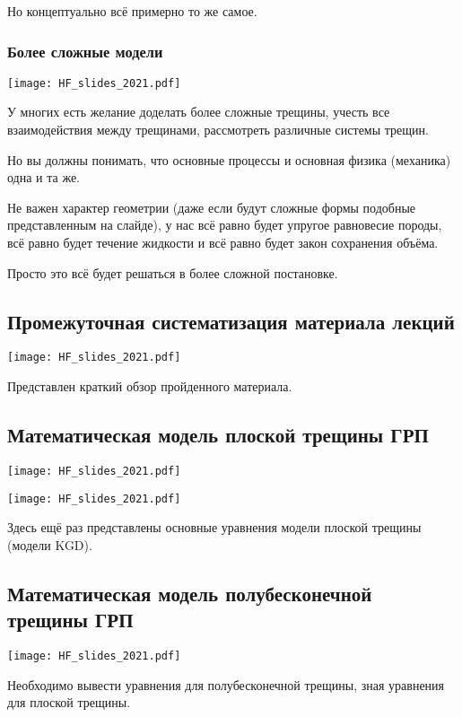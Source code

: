 \documentclass[main.tex]{subfiles}
\begin{document}
Но концептуально всё примерно то же самое.

\subsubsection{Более сложные модели}

\texttt{[image: HF\_slides\_2021.pdf]}

У многих есть желание доделать более сложные трещины, учесть все взаимодействия между трещинами, рассмотреть различные системы трещин.

Но вы должны понимать, что основные процессы и основная физика (механика) одна и та же.

Не важен характер геометрии (даже если будут сложные формы подобные представленным на слайде), у нас всё равно будет упругое равновесие породы, всё равно будет течение жидкости и всё равно будет закон сохранения объёма.

Просто это всё будет решаться в более сложной постановке.

\subsection{Промежуточная систематизация материала лекций}

\texttt{[image: HF\_slides\_2021.pdf]}

Представлен краткий обзор пройденного материала.

\subsection{Математическая модель плоской трещины ГРП}

\texttt{[image: HF\_slides\_2021.pdf]}

\texttt{[image: HF\_slides\_2021.pdf]}

Здесь ещё раз представлены основные уравнения модели плоской трещины (модели KGD).

\subsection{Математическая модель полубесконечной трещины ГРП}

\texttt{[image: HF\_slides\_2021.pdf]}

Необходимо вывести уравнения для полубесконечной трещины, зная уравнения для плоской трещины.
\end{document}
